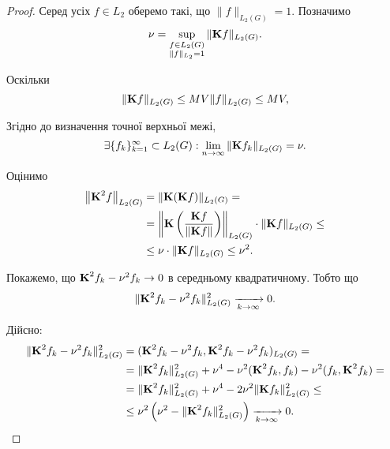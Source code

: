 \begin{proof}
    Серед усіх $f \in L_2$ оберемо такі, що $\|f\|_{L_2(G)} = 1$. Позначимо 
    \begin{equation}
        \nu = \Sup_{\substack{f \in L_2(G) \\ \|f\|_{L_2} = 1}} \|\bf{K} f\|_{L_2(G)}.
    \end{equation}
    
    Оскільки
    \begin{equation}
        \|\bf{K} f\|_{L_2(G)} \le MV \|f\|_{L_2(G)} \le MV,
    \end{equation}


    Згідно до визначення точної верхньої межі,
    \begin{equation}
        \exists \{ f_k \}_{k = 1}^\infty \subset L_2(G):\lim_{n \to \infty} \|\bf{K} f_k\|_{L_2(G)} = \nu.
    \end{equation}

    Оцінимо 
    \begin{equation}
        \begin{aligned} 
        \left\| \bf{K}^2 f\right\|_{L_2(G)} &= \| \bf{K} (\bf{K} f)\|_{L_2(G)} = \\
        &=  \left\| \bf{K}\left( \dfrac{\bf{K}f}{\|\bf{K}f\|}\right) \right\|_{L_2(G)} \cdot \|\bf{K} f\|_{L_2(G)} \le \\
        &\le  \nu \cdot \|\bf{K} f\|_{L_2(G)} \le \nu^2.
        \end{aligned}
    \end{equation}
    
    Покажемо, що $\bf{K}^2 f_k - \nu^2 f_k \to 0$ в середньому квадратичному. Тобто що
    \begin{equation}
        \| \bf{K}^2 f_k - \nu^2 f_k \|_{L_2(G)}^2 \xrightarrow[k \to \infty]{} 0.
    \end{equation}

    Дійсно:
    \begin{equation}
        \begin{aligned}
            \| \bf{K}^2 f_k - \nu^2 f_k \|_{L_2(G)}^2 &= (\bf{K}^2 f_k - \nu^2 f_k, \bf{K}^2 f_k - \nu^2 f_k)_{L_2(G)} = \\
            &= \|\bf{K}^2 f_k\|_{L_2(G)}^2 + \nu^4 - \nu^2 (\bf{K}^2 f_k, f_k) - \nu^2 (f_k, \bf{K}^2 f_k) = \\
            &= \|\bf{K}^2 f_k\|_{L_2(G)}^2 + \nu^4 - 2 \nu^2 \|\bf{K} f_k\|_{L_2(G)}^2 \le \\
            &\le \nu^2 \left(\nu^2 - \|\bf{K}^2 f_k\|_{L_2(G)}^2\right) \xrightarrow[k\to\infty]{} 0.
        \end{aligned}
    \end{equation}


\end{proof}
